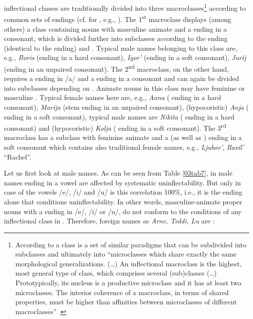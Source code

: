 \documentclass[output=paper,colorlinks,citecolor=brown]{langscibook}
\begin{document}
 inflectional classes are traditionally divided into three macroclasses\footnote{According to \citet{dressler1997, dressler2003} a class is a set of similar paradigms that can be subdivided into subclasses and	ultimately into ``microclasses which share exactly the same morphological generalizations. (\ldots) An inflectional macroclass is the highest, most general type of class, which comprises several	(sub)classes (\ldots) Prototypically, its nucleus is a productive microclass and it has at least two microclasses. The interior coherence of a macroclass, in terms of shared properties, must be higher than affinities between microclasses of different macroclasses'' \citep[35--36]{dressler2003}.} according to common sets of endings (cf. for , e.g., \citealt[130]{timberlake2004}). The 1\textsuperscript{st} macroclass displays (among others) a class containing nouns with masculine animate  and a  ending in a consonant, which is divided further into subclasses according to the  ending (identical to the  ending) and . Typical  male names belonging to this class are, e.g., \emph{Boris} (ending in a hard consonant), \emph{Igor'} (ending in a soft consonant), \emph{Jurij} (ending in an unpaired consonant). The 2\textsuperscript{nd} macroclass, on the other hand, requires a  ending in /a/ and a  ending in a consonant and can again be divided into subclasses depending on . Animate nouns in this class may have feminine or masculine . Typical  female names here are, e.g., \emph{Anna} ( ending in a hard consonant), \emph{Marija} (stem ending in an unpaired consonant), (hypocoristic) \emph{Anja} ( ending in a soft consonant), typical male names are \emph{Nikita} ( ending in a hard consonant) and (hypocoristic) \emph{Kolja} ( ending in a soft consonant). The 3\textsuperscript{rd} macroclass has a subclass with feminine animate  and a  (as well as ) ending in a soft consonant which contains also traditional  female names, e.g., \emph{Ljubov'}, \emph{Raxil'} ``Rachel''.

Let us first look at male names. As can be seen from Table \ref{03tab7}, in  male names ending in a vowel are affected by systematic uninflectability. But only in case of the vowels /e/, /i/ and /u/ is this correlation 100\%, i.e., it is the  ending alone that conditions uninflectability. In other words, masculine-animate proper nouns with a  ending in /e/, /i/ or /u/, do not conform to the conditions of any inflectional class in . Therefore, foreign names as \emph{Arne, Teddi, Lu} are :
\end{document}
